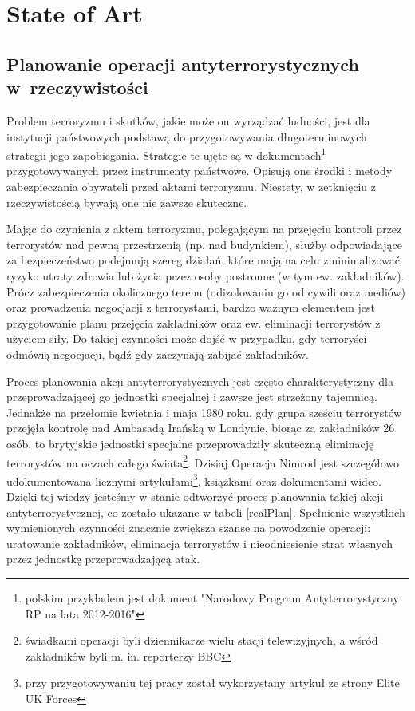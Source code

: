 \chapter{State of Art}
\section{Planowanie operacji antyterrorystycznych w~rzeczywistości}\label{realChapter}
Problem terroryzmu i skutków, jakie może on wyrządzać ludności, jest dla instytucji państwowych podstawą do przygotowywania długoterminowych strategii jego zapobiegania. Strategie te ujęte są w dokumentach\footnote{polskim przykładem jest dokument "Narodowy Program Antyterrorystyczny RP na lata 2012-2016"} przygotowywanych przez instrumenty państwowe. Opisują one środki i metody zabezpieczania obywateli przed aktami terroryzmu. Niestety, w zetknięciu z rzeczywistością bywają one nie zawsze skuteczne.

Mając do czynienia z aktem terroryzmu, polegającym na przejęciu kontroli przez terrorystów nad pewną przestrzenią (np. nad budynkiem), służby odpowiadające za bezpieczeństwo podejmują szereg działań, które mają na celu zminimalizować ryzyko utraty zdrowia lub życia przez osoby postronne (w tym ew. zakładników). Prócz zabezpieczenia okolicznego terenu (odizolowaniu go od cywili oraz mediów) oraz prowadzenia negocjacji z terrorystami, bardzo ważnym elementem jest przygotowanie planu przejęcia zakładników oraz ew. eliminacji terrorystów z użyciem siły. Do takiej czynności może dojść w przypadku, gdy terroryści odmówią negocjacji, bądź gdy zaczynają zabijać zakładników.

Proces planowania akcji antyterrorystycznych jest często charakterystyczny dla przeprowadzającej go jednostki specjalnej i zawsze jest strzeżony tajemnicą. Jednakże na przełomie kwietnia i maja 1980 roku, gdy grupa sześciu terrorystów przejęła kontrolę nad Ambasadą Irańską w Londynie, biorąc za zakładników 26 osób, to brytyjskie jednostki specjalne przeprowadziły skuteczną eliminację terrorystów na oczach całego świata\footnote{świadkami operacji byli dziennikarze wielu stacji telewizyjnych, a wśród zakładników byli m. in. reporterzy BBC}. Dzisiaj Operacja Nimrod jest szczegółowo udokumentowana licznymi artykułami\footnote{przy przygotowywaniu tej pracy został wykorzystany artykuł ze strony Elite UK Forces\cite{eliteUK}}, książkami oraz dokumentami wideo. Dzięki tej wiedzy jesteśmy w stanie odtworzyć proces planowania takiej akcji antyterrorystycznej, co zostało ukazane w tabeli \ref{realPlan}. Spełnienie wszystkich wymienionych czynności znacznie zwiększa szanse na powodzenie operacji: uratowanie zakładników, eliminacja terrorystów i nieodniesienie strat własnych przez jednostkę przeprowadzającą atak.

